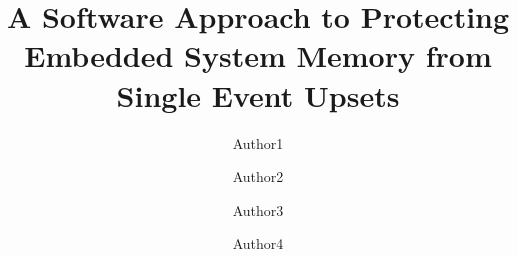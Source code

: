 \documentclass[runningheads,a4paper]{llncs}
\begin{document}
\mainmatter  %

\date{}

\title{\Large \bf A Software Approach to Protecting Embedded System Memory from Single Event Upsets}


%
%

\vspace{-20pt}

\author{Author1%
\and Author2\and Author3\and Author4}
%
\authorrunning{}

\vspace{-30pt}


%
%

\toctitle{}
\tocauthor{}
\maketitle

\vspace{-30pt}










{\footnotesize 
	}
\end{document}

